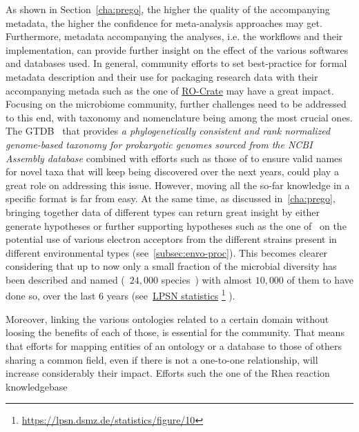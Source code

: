       As shown in Section~\ref{cha:prego}, the higher the quality of the accompanying metadata, 
      the higher the confidence for meta-analysis approaches may get. 
      Furthermore, metadata accompanying the analyses, i.e. the workflows and their implementation, can provide further 
      insight on the effect of the various softwares and databases used. 
      In general, community efforts to set best-practice for formal metadata description
      and their use for packaging research data with their accompanying metada 
      such as the one of
      \href{https://www.researchobject.org/ro-crate/}{RO-Crate} may have a great impact.  
      Focusing on the microbiome community, 
      further challenges need to be addressed to this end, 
      with taxonomy and nomenclature being among the most crucial ones. 
      The GTDB~\citep{parks_gtdb_2022} that provides \textit{a phylogenetically
      consistent and rank normalized genome-based taxonomy for prokaryotic genomes sourced from the NCBI Assembly database}
      combined with efforts such as those of \citeauthor{pallen2021next} to ensure valid names for novel taxa that 
      will keep being discovered over the next years, could play a great role on addressing this issue. 
      However, moving all the so-far knowledge in a specific format is far from easy. 
      At the same time, as discussed in~\ref{cha:prego}, bringing together data of different types can return great insight 
      by either generate hypotheses or further supporting hypotheses such as the one of~\citeauthor{pavloudi2017diversity} 
      on the potential use of various electron acceptors from the different strains present in different environmental types
      (see~\ref{subsec:envo-proc}).
      This becomes clearer considering that up to now only a small fraction of the microbial diversity has been 
      described and named (~$24,000$ species~\citep{parte2020list}) with almost $10,000$ of them to have done so, over the last 6 years
      (see~\href{https://lpsn.dsmz.de/statistics/figure/10}{LPSN statistics}
      \footnote{\href{https://lpsn.dsmz.de/statistics/figure/10}{https://lpsn.dsmz.de/statistics/figure/10}}
      ). 

      Moreover, linking the various ontologies related to a certain domain without loosing the 
      benefits of each of those, is essential for the community. 
      That means that efforts for mapping entities of an ontology or a database to those of others 
      sharing a common field, even if there is not a one-to-one relationship, will increase considerably their impact.  
      Efforts such the one of the Rhea reaction knowledgebase~\citep{bansal2022rhea} 

